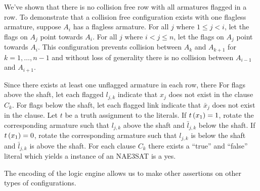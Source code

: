 \begin{pf}
\begin{enumerate}
We've shown that there is no collision free row with all armatures flagged in a row.  
To demonstrate that a collision free configuration exists with one flagless armature, suppose $A_i$ 
has a flagless armature.  For all $j$ where $ 1 \leq j < i$, let the flags on $A_j$ point towards 
$A_i$. For all $j$ where $ i < j \leq n$, let the flags on $A_j$ point towards 
$A_i$.  This configuration prevents collision between $A_k$ and $A_{k+1}$ for $k = 1,\dots,n-1$ and 
without loss of generality there is no collision between $A_{i-1}$ and $A_{i+1}$.
\end{enumerate}
Since there exists at least one unflagged armature in each row, there 
For flags above the shaft, let each flagged $l_{j,k}$ 
indicate that $x_j$ does not exist in the clause $C_k$.  For flags below the shaft, let each 
flagged link indicate that $\bar{x}_j$ does not exist in the clause.  Let 
$t$ be a truth assignment to the literals.  If $t \left( x_1 \right) = 1$, rotate the corresponding armature 
such that $l_{j,k}$ above the shaft and $\bar{l}_{j,k}$ below the shaft.  If $t \left( x_1 \right) = 0$, 
rotate the corresponding armature such that $l_{j,k}$ is below the shaft and $\bar{l}_{j,k}$ is 
above the shaft.  For each clause $C_k$ there exists a ``true'' and ``false'' literal which yields 
a instance of an NAE3SAT is a yes.
\end{pf}

The encoding of the logic engine allows us to make other assertions on other types of 
configurations.
